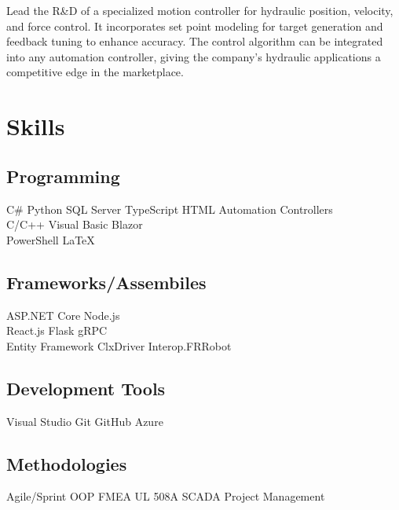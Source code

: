 \documentclass{TTurner}
\begin{document}
\begin{minipage}[t]{0.75\textwidth}
\begin{tightemize}
\item Lead the R\&D of a specialized motion controller for hydraulic position, velocity, and force control. It incorporates set point modeling for target generation and feedback tuning to enhance accuracy. The control algorithm can be integrated into any automation controller, giving the company's hydraulic applications a competitive edge in the marketplace. 
\end{tightemize}
\sectionsep


\end{minipage} 
\hfill
\begin{minipage}[t]{0.23\textwidth} 

\section{Skills}
\subsection{Programming}
\sectionsep
{}
C\# \textbullet{} Python \textbullet{} SQL Server \textbullet{} TypeScript \textbullet{} HTML \textbullet{} Automation Controllers\\
\sectionsep
{}
C/C++ \textbullet{} Visual Basic \textbullet{} Blazor \textbullet{}\\
PowerShell \textbullet{} \LaTeX\\
\sectionsep
\sectionsep
\subsection{Frameworks/Assembiles}
\sectionsep
ASP.NET Core \textbullet{} Node.js \textbullet{}\\
React.js \textbullet{} Flask \textbullet{} gRPC \textbullet{}\\
Entity Framework \textbullet{} ClxDriver \textbullet{} Interop.FRRobot
\sectionsep
\sectionsep
\subsection{Development Tools}
\sectionsep
Visual Studio \textbullet{} Git \textbullet{} GitHub \textbullet{} Azure\\
\sectionsep
\subsection{Methodologies}
\sectionsep
Agile/Sprint \textbullet{} OOP \textbullet{} FMEA \textbullet{} UL 508A \textbullet{} SCADA \textbullet{} Project Management\\
\sectionsep



\end{minipage}
\end{document}
